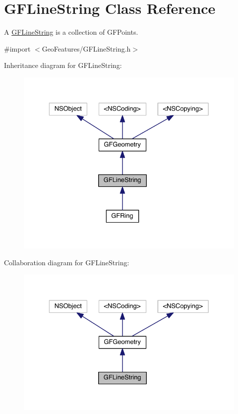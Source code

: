 \hypertarget{interface_g_f_line_string}{}\section{G\+F\+Line\+String Class Reference}
\label{interface_g_f_line_string}


A \hyperlink{interface_g_f_line_string}{G\+F\+Line\+String} is a collection of G\+F\+Points.  




{\ttfamily \#import $<$Geo\+Features/\+G\+F\+Line\+String.\+h$>$}



Inheritance diagram for G\+F\+Line\+String\+:\nopagebreak
\begin{figure}[H]
\begin{center}
\leavevmode
\includegraphics[width=329pt]{interface_g_f_line_string__inherit__graph}
\end{center}
\end{figure}


Collaboration diagram for G\+F\+Line\+String\+:\nopagebreak
\begin{figure}[H]
\begin{center}
\leavevmode
\includegraphics[width=329pt]{interface_g_f_line_string__coll__graph}
\end{center}
\end{figure}
